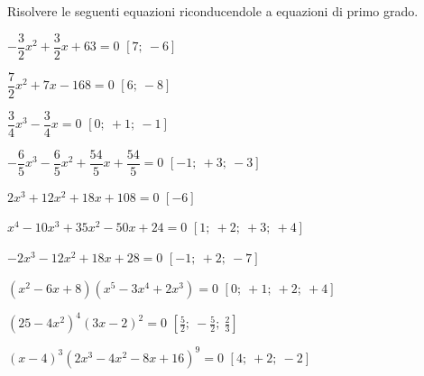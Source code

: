 \begin{esercizio}[*]
\label{ese:20.9}
Risolvere le seguenti equazioni riconducendole a equazioni di primo grado.
\begin{enumeratea}
 \item \(-{\dfrac{3}{2}}x^{2}+\dfrac{3}{2}x+63=0\) \hfill \(\left[7;~-6\right]\)
 \item \(\dfrac{7}{2}x^{2}+7x-168=0\) \hfill \(\left[6;~-8\right]\)
 \item \(\dfrac{3}{4}x^{3}-\dfrac{3}{4}x=0\) \hfill \(\left[0;~+1;~-1\right]\)
 \item \(-{\dfrac{6}{5}}x^{3}-\dfrac{6}{5}x^{2}+\dfrac{54}{5}x+\dfrac{54}{5}=0\) 
  \hfill \(\left[-1;~+3;~-3\right]\)
 \item \(2x^{3}+12x^{2}+18x+108=0\) \hfill \(\left[-6\right]\)
 \item \(x^{4}-10x^{3}+35x^{2}-50x+24=0\) \hfill \(\left[1;~+2;~+3;~+4\right]\)
 \item \(-2x^{3}-12x^{2}+18x+28=0\) \hfill \(\left[-1;~+2;~-7\right]\)
 \item \((x^{2}-6x+8)(x^{5}-3x^{4}+2x^{3})=0\) 
  \hfill \(\left[0;~+1;~+2;~+4\right]\)
 \item \(\left(25-4x^{2}\right)^{4}\left(3x-2\right)^{2}=0\) 
  \hfill \(\left[\frac{5}{2};~-\frac{5}{2};~\frac{2}{3}\right]\)
 \item \((x-4)^{3}\left(2x^{3}-4x^{2}-8x+16\right)^{9}=0\) 
  \hfill \(\left[4;~+2;~-2\right]\)

\end{enumeratea}
\end{esercizio}
